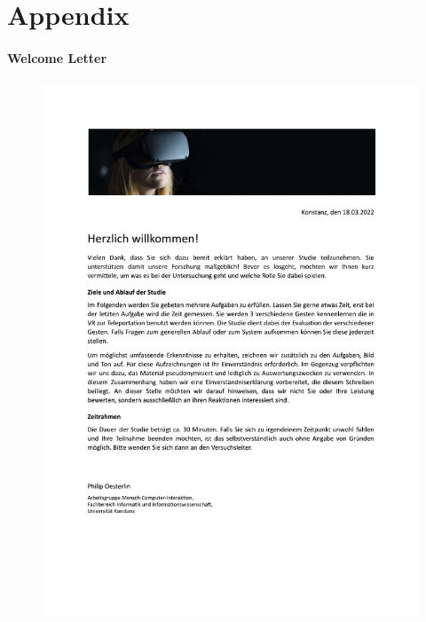 \chapter{Appendix}


\subsubsection{Welcome Letter}
\begin{figure}[!h]
\centering
\includegraphics[width=\textwidth]{figures/Appendix/welcome letter.pdf}
\end{figure}


